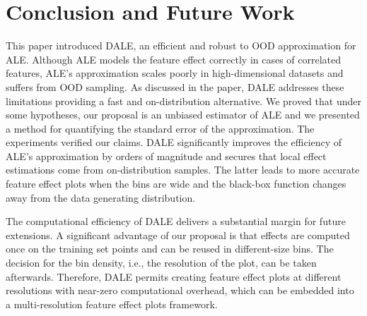 \documentclass[wcp]{jmlr}
\begin{document}
\section{Conclusion and Future Work} This paper introduced DALE, an efficient and robust to OOD approximation for ALE. Although ALE models the feature effect correctly in cases of correlated features, ALE's approximation scales poorly in high-dimensional datasets and suffers from OOD sampling. As discussed in the paper, DALE addresses these limitations providing a fast and on-distribution alternative. We proved that under some hypotheses, our proposal is an unbiased estimator of ALE and we presented a method for quantifying the standard error of the approximation. The experiments verified our claims. DALE significantly improves the efficiency of ALE's approximation by orders of magnitude and secures that local effect estimations come from on-distribution samples. The latter leads to more accurate feature effect plots when the bins are wide and the black-box function changes away from the data generating distribution.

The computational efficiency of DALE delivers a substantial margin for future extensions. A significant advantage of our proposal is that effects are computed once on the training set points and can be reused in different-size bins. The decision for the bin density, i.e., the resolution of the plot, can be taken afterwards. Therefore, DALE permits creating feature effect plots at different resolutions with near-zero computational overhead, which can be embedded into a multi-resolution feature effect plots framework.




%






\end{document}
